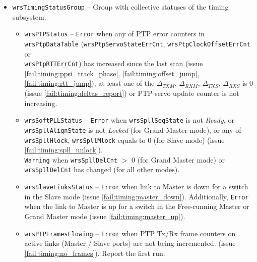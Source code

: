 \begin{itemize}
\begin{itemize}
      \item \texttt{wrsTimingStatusGroup} -- Group with collective statuses of
        the timing subsystem.
      \begin{itemize}
        \item \texttt{wrsPTPStatus} -- \texttt{Error} when any of PTP error counters in
          \texttt{wrsPtpDataTable} (\texttt{wrsPtpServoStateErrCnt},
          \texttt{wrsPtpClockOffsetErrCnt} or\\ \texttt{wrsPtpRTTErrCnt}) has
          increased since the last scan (issue
          \ref{fail:timing:ppsi_track_phase}, \ref{fail:timing:offset_jump},
          \ref{fail:timing:rtt_jump}), at least one of the $\Delta_{TXM}$,
          $\Delta_{RXM}$, $\Delta_{TXS}$, $\Delta_{RXS}$ is 0 (issue
          \ref{fail:timing:deltas_report}) or PTP servo update counter is not
          increasing.
        \item \texttt{wrsSoftPLLStatus} -- \texttt{Error} when \texttt{wrsSpllSeqState}
          is not \emph{Ready}, or \texttt{wrsSpllAlignState} is not
          \emph{Locked} (for Grand Master mode), or any of
          \texttt{wrsSpllHlock}, \texttt{wrsSpllMlock} equals to 0 (for Slave
          mode) (issue \ref{fail:timing:spll_unlock}).\\
          \texttt{Warning} when \texttt{wrsSpllDelCnt} $>$ 0 (for Grand Master
          mode) or \texttt{wrsSpllDelCnt} has changed (for all other modes).
        \item \texttt{wrsSlaveLinksStatus} -- \texttt{Error} when link to Master
          is down for a switch in the Slave mode (issue
          \ref{fail:timing:master_down}). Additionally, \texttt{Error} when the
          link to Master is up for a switch in the Free-running Master or Grand
          Master mode (issue \ref{fail:timing:master_up}).
        \item \texttt{wrsPTPFramesFlowing} -- \texttt{Error} when PTP Tx/Rx
          frame counters on active links (Master / Slave ports) are not being
          incremented. (issue \ref{fail:timing:no_frames}). Report the first
          run.
      \end{itemize}


\end{itemize}
\end{itemize}
